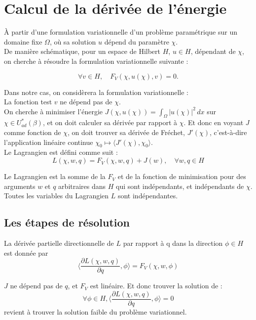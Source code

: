 \section{Calcul de la dérivée de l'énergie}


À partir d'une formulation variationnelle d'un problème paramétrique sur un domaine fixe $\Omega$, où sa solution $u$ dépend du paramètre $\chi$.\\ 

De manière schématique, pour un espace de Hilbert $H$, $u \in H$, dépendant de $\chi$, on cherche à résoudre la formulation variationnelle suivante :

\[\forall v\in H, \quad F_V(\chi, u(\chi), v) = 0. \]

Dans notre cas, on considèrera la formulation variationnelle : \\


La fonction test $v$ ne dépend pas de $\chi$.\\

On cherche à minimiser l'énergie $J(\chi,u(\chi)) = \int_{\Omega} |u(\chi)|^2 \, dx$ sur $\chi \in U_{ad}^*(\beta)$, et on doit calculer sa dérivée par rapport à $\chi$. Et donc en voyant $J$ comme fonction de $\chi$, on doit trouver sa dérivée de Fréchet, $J'(\chi)$, c'est-à-dire l'application linéaire continue $\chi_0 \mapsto \langle J'(\chi), \chi_0 \rangle$.\\

Le Lagrangien est défini comme suit :
\[
L(\chi, w, q) = F_V(\chi, w, q) + J(w), \quad \forall w, q \in H
\]

Le Lagrangien est la somme de la $F_V$ et de la fonction de minimisation pour des arguments $w$ et $q$ arbitraires dans $H$ qui sont indépendants, et indépendants de $\chi$.
\\

Toutes les variables du Lagrangien $L$ sont indépendantes.\\
\subsection{Les étapes de résolution } 
La dérivée partielle directionnelle de $L$ par rapport à q dans la direction $\phi \in H$ est donnée par
\[
\langle \frac{\partial L (\chi, w, q)}{\partial q}, \phi \rangle = F_V (\chi, w, \phi)
\]

$J$ ne dépend pas de $q$, et $F_V$ est linéaire. Et donc trouver la solution de :
\[
\forall \phi \in H, \langle \frac{\partial L (\chi, w, q)}{\partial q}, \phi \rangle = 0
\]
revient à trouver la solution faible du problème variationnel.


